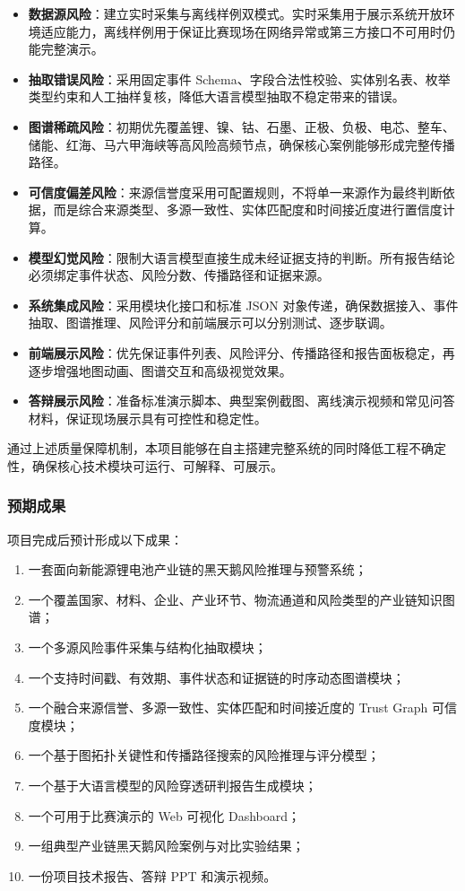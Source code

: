 ﻿\documentclass[12pt,a4paper]{article}
\newcommand{\term}[1]{\textbf{#1}}
\begin{document}
\begin{itemize}
    \item \term{数据源风险}：建立实时采集与离线样例双模式。实时采集用于展示系统开放环境适应能力，离线样例用于保证比赛现场在网络异常或第三方接口不可用时仍能完整演示。
    \item \term{抽取错误风险}：采用固定事件 Schema、字段合法性校验、实体别名表、枚举类型约束和人工抽样复核，降低大语言模型抽取不稳定带来的错误。
    \item \term{图谱稀疏风险}：初期优先覆盖锂、镍、钴、石墨、正极、负极、电芯、整车、储能、红海、马六甲海峡等高风险高频节点，确保核心案例能够形成完整传播路径。
    \item \term{可信度偏差风险}：来源信誉度采用可配置规则，不将单一来源作为最终判断依据，而是综合来源类型、多源一致性、实体匹配度和时间接近度进行置信度计算。
    \item \term{模型幻觉风险}：限制大语言模型直接生成未经证据支持的判断。所有报告结论必须绑定事件状态、风险分数、传播路径和证据来源。
    \item \term{系统集成风险}：采用模块化接口和标准 JSON 对象传递，确保数据接入、事件抽取、图谱推理、风险评分和前端展示可以分别测试、逐步联调。
    \item \term{前端展示风险}：优先保证事件列表、风险评分、传播路径和报告面板稳定，再逐步增强地图动画、图谱交互和高级视觉效果。
    \item \term{答辩展示风险}：准备标准演示脚本、典型案例截图、离线演示视频和常见问答材料，保证现场展示具有可控性和稳定性。
\end{itemize}

通过上述质量保障机制，本项目能够在自主搭建完整系统的同时降低工程不确定性，确保核心技术模块可运行、可解释、可展示。

\subsubsection{预期成果}

项目完成后预计形成以下成果：
\begin{enumerate}
    \item 一套面向新能源锂电池产业链的黑天鹅风险推理与预警系统；
    \item 一个覆盖国家、材料、企业、产业环节、物流通道和风险类型的产业链知识图谱；
    \item 一个多源风险事件采集与结构化抽取模块；
    \item 一个支持时间戳、有效期、事件状态和证据链的时序动态图谱模块；
    \item 一个融合来源信誉、多源一致性、实体匹配和时间接近度的 Trust Graph 可信度模块；
    \item 一个基于图拓扑关键性和传播路径搜索的风险推理与评分模型；
    \item 一个基于大语言模型的风险穿透研判报告生成模块；
    \item 一个可用于比赛演示的 Web 可视化 Dashboard；
    \item 一组典型产业链黑天鹅风险案例与对比实验结果；
    \item 一份项目技术报告、答辩 PPT 和演示视频。
\end{enumerate}
\end{document}
